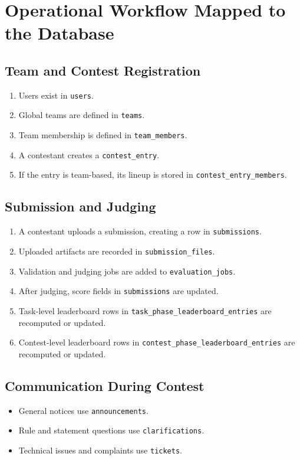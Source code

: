 \documentclass[11pt,a4paper]{article}
\begin{document}
\section{Operational Workflow Mapped to the Database}

\subsection{Team and Contest Registration}
\begin{enumerate}
    \item Users exist in \texttt{users}.
    \item Global teams are defined in \texttt{teams}.
    \item Team membership is defined in \texttt{team\_members}.
    \item A contestant creates a \texttt{contest\_entry}.
    \item If the entry is team-based, its lineup is stored in \texttt{contest\_entry\_members}.
\end{enumerate}

\subsection{Submission and Judging}
\begin{enumerate}
    \item A contestant uploads a submission, creating a row in \texttt{submissions}.
    \item Uploaded artifacts are recorded in \texttt{submission\_files}.
    \item Validation and judging jobs are added to \texttt{evaluation\_jobs}.
    \item After judging, score fields in \texttt{submissions} are updated.
    \item Task-level leaderboard rows in \texttt{task\_phase\_leaderboard\_entries} are recomputed or updated.
    \item Contest-level leaderboard rows in \texttt{contest\_phase\_leaderboard\_entries} are recomputed or updated.
\end{enumerate}

\subsection{Communication During Contest}
\begin{itemize}
    \item General notices use \texttt{announcements}.
    \item Rule and statement questions use \texttt{clarifications}.
    \item Technical issues and complaints use \texttt{tickets}.
\end{itemize}
\end{document}
